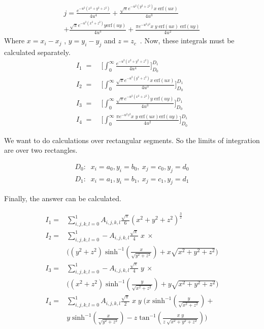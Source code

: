 \documentclass[final,5p,times,twocolumn]{elsarticle}
\begin{document}
\begin{equation}\label {eq12}
\begin{split}
j = \frac{e^{-u^2(x^2+y^2+z^2)}}{4u^4} + \frac{\sqrt{\pi}e^{-u^2(y^2 + z^2)}x\; \mathrm{erf}(u x)}{4u^3} \\
+\frac{\sqrt{\pi}e^{-u^2(x^2 + z^2)}y \mathrm {erf}(u y)}{4u^3} + \frac{\pi e^{-u^2 z^2}x\;y\; \mathrm{erf}(u x)\; \mathrm{erf}(u y)}{4u^2}
\end{split}
\end{equation}
Where $x = x_i - x_j$ , $y = y_i - y_j$ and $z = z_c$\ . 
Now, these integrals must be calculated separately.
\begin{equation}\label {eq13}
\begin{split}
I_1\; = \;&\bigg[\int_0^{\infty}\frac{e^{-u^2(x^2+y^2+z^2)}} {4u^4}\bigg]_{D_0}^{D_1}\\
I_2\; = \;&\bigg[\int_0^{\infty}\frac{\sqrt{\pi}e^{-u^2(y^2 + z^2)}x\; \mathrm{erf}(u x)}{4u^3}\bigg]_{D_0}^{D_1}\\
I_3\; = \;&\bigg[\int_0^{\infty}\frac{\sqrt{\pi}e^{-u^2(x^2 + z^2)}y\; \mathrm {erf}(u y)}{4u^3}\bigg]_{D_0}^{D_1}\\
I_4\; = \;&\bigg[\int_0^{\infty}\frac{\pi e^{-u^2 z^2}x\; y\; \mathrm{erf}(u x) \mathrm{erf}(u y)}{4u^2}\bigg]_{D_0}^{D_1}
\end{split}
\end{equation}

We want to do calculations over rectangular segments. So the limits of integration are over two rectangles.

\begin{equation}\label {eq14}
\begin{split}
D_0:\;\;x_i=a_0, y_i = b_0,\ x_j = c_0,y_j = d_0\\
D_1:\;\;x_i=a_1, y_i = b_1, \ x_j = c_1,y_j = d_1
\end{split}
\end{equation}

Finally, the answer can be calculated.

\begin{equation}\label {eq15}
\begin{split}
I_1 = &\sum_{i,j,k,l=0}^1 A_{i,j,k,l}\frac {\sqrt{\pi} } {6} (x^2+y^2+z^2)^{\frac 3 2}\\
I_2 = &\sum_{i,j,k,l=0}^1 -A_{i,j,k,l}\frac {\sqrt{\pi} } {4}\;x\ \times \\
&\Bigg((y^2 + z^2) \;\mathrm{sinh^{-1}}(\frac{x}{\sqrt{y^2 + z^2}}) +x \sqrt{x^2 + y^2 + z^2}\Bigg)\\ 
I_3 = &\sum_{i,j,k,l=0}^1 -A_{i,j,k,l}\frac {\sqrt{\pi} } {4}\;y\ \times \\
&\Bigg((x^2 + z^2)\;\mathrm{sinh^{-1}}(\frac{y}{\sqrt{x^2 + z^2}}) +y \sqrt{x^2 + y^2 + z^2}\Bigg) \\ 
I_4 = &\sum_{i,j,k,l=0}^1 A_{i,j,k,l}\frac {\sqrt{\pi} } {2}\;x\;y\; \Bigg(x\;\mathrm{sinh^{-1}}(\frac{y}{\sqrt{x^2 + z^2}})+ \\
 &y\;\mathrm{sinh^{-1}}(\frac{x}{\sqrt{y^2 + z^2}}) -z\;\mathrm{tan^{-1}}(\frac{x\;y}{z\;\sqrt{x^2+y^2 + z^2}}) \Bigg)\\ 
\end{split}
\end{equation}
\end{document}
